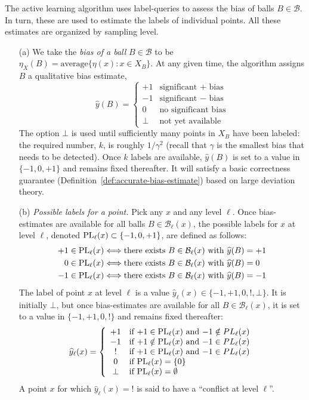 \documentclass[anon,12pt]{colt2022} %
\def\B{{\mathcal B}}
\def\yh{{\widehat{y}}}
\def\PL{{\mbox{\rm PL}}}
\begin{document}
The active learning algorithm uses label-queries to assess the bias of balls $B \in \B$. In turn, these are used to estimate the labels of individual points. All these estimates are organized by sampling level.

\begin{enumerate}

\item[(a)] We take the \emph{bias of a ball} $B \in \B$ to be
$\eta_X(B) = \mbox{average}\{\eta(x): x \in X_B \}$.
At any given time, the algorithm assigns $B$ a qualitative bias estimate,
$$ \yh(B) = 
\left\{
\begin{array}{cl}
+1 & \mbox{significant $+$ bias} \\
-1 & \mbox{significant $-$ bias} \\
0 & \mbox{no significant bias} \\
\bot & \mbox{not yet available}
\end{array}
\right.
$$
The option $\bot$ is used until sufficiently many points in $X_B$ have been labeled: the required number, $k$, is roughly $1/\gamma^2$ (recall that $\gamma$ is the smallest bias that needs to be detected). Once $k$ labels are available, $\yh(B)$ is set to a value in $\{-1,0,+1\}$ and remains fixed thereafter. It will satisfy a basic correctness guarantee (Definition~\ref{def:accurate-bias-estimate}) based on large deviation theory. 

\item[(b)] \emph{Possible labels for a point.} Pick any $x$ and any level $\ell$. Once bias-estimates are available for all balls $B \in \B_\ell(x)$, the possible labels for $x$ at level $\ell$, denoted $\PL_\ell(x) \subset \{-1,0,+1\}$, are defined as follows:
\begin{gather}
+1 \in \PL_\ell(x) \Longleftrightarrow \mbox{there exists $B \in
  \B_\ell(x)$ with $\yh(B) = +1$} \notag \\
0 \in \PL_\ell(x) \Longleftrightarrow \mbox{there exists $B \in \B_\ell(x)$ with $\yh(B) = 0$} \notag \\
-1 \in \PL_\ell(x) \Longleftrightarrow \mbox{there exists $B \in \B_\ell(x)$ with $\yh(B) = -1$}
\label{eq:PL}
\end{gather}
The label of point $x$ at level $\ell$ is a value $\yh_\ell(x) \in \{-1,+1,0,!,\bot\}$. It is initially $\bot$, but once bias-estimates are available for all $B \in \B_\ell(x)$, it is set to a value in $\{-1,+1,0,!\}$ and remains fixed thereafter:
\begin{equation}
\yh_\ell(x) = 
\left\{
  \begin{array}{cl}
+1   & \mbox{if $+1 \in \PL_\ell(x)$ and $-1 \notin PL_\ell(x)$} \\
-1   & \mbox{if $+1 \notin \PL_\ell(x)$ and $-1 \in PL_\ell(x)$} \\
!    & \mbox{if $+1 \in \PL_\ell(x)$ and $-1 \in PL_\ell(x)$} \\
0    & \mbox{if $\PL_\ell(x)=\{0\}$} \\
\bot & \mbox{if $\PL_\ell(x)=\emptyset$}
\end{array}
\right.
\label{eq:provisional-label}
\end{equation}
A point $x$ for which $\yh_\ell(x)=!$ is said to have a ``conflict at
level $\ell$''.


\end{enumerate}
\end{document}

